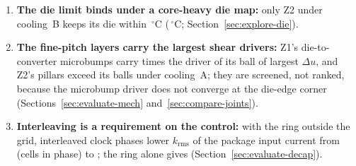 \documentclass[10pt]{article}
\newcommand{\degC}{\,$^\circ$C}
\newcommand{\cl}[1]{\textbf{#1}\enspace}
\begin{document}
\begin{enumerate}
\FrTfiveSaveLo--\FrTfiveSaveHi~W but protrudes \FrProtrudeTfive~\textmu m below the Z2 board
(Section~\ref{sec:explore-codesign}).
\item \cl{The die limit binds under a core-heavy die map:} only Z2 under cooling~B keeps its die within
\MthLimDie\degC{} (\WrHotBZtwoDie\degC; Section~\ref{sec:explore-die}).
\item \cl{The fine-pitch layers carry the largest shear drivers:} Z1's die-to-converter microbumps
carry \WrGamRatioAZoneWord{} times the driver of its ball of largest $\Delta u$, and Z2's pillars exceed its balls
under cooling~A; they are screened, not ranked, because the microbump driver does not converge at the
die-edge corner (Sections~\ref{sec:evaluate-mech} and~\ref{sec:compare-joints}).
\item \cl{Interleaving is a requirement on the control:} with the ring outside the grid,
\FrDecapPhases{} interleaved clock phases lower $k_{\mathrm{rms}}$ of the package input current from
\WrKsync{} (cells in phase) to \WrKrms; the ring alone gives \WrKring{}
(Section~\ref{sec:evaluate-decap}).
\end{enumerate}
\end{document}
